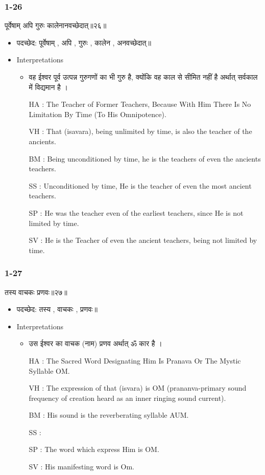 \begin{frame}[fragile]\frametitle{1-26}
\begin{sanskrit}
पूर्वेषाम् अपि गुरुः कालेनानवच्छेदात्॥२६॥
\end{sanskrit}

	\begin{itemize}
	\item पदच्छेद: पूर्वेषाम् , अपि , गुरुः , कालेन , अनवच्छेदात्॥
	\item Interpretations
		\begin{itemize}	
		\item वह ईश्वर पूर्व उत्पन्न गुरुगणों का भी गुरु है, क्योंकि वह काल से सीमित नहीं है अर्थात् सर्वकाल में विद्यमान है ।
		\item [HA]: The Teacher of Former Teachers, Because With Him There Is No Limitation By Time (To His Omnipotence).
		\item [VH]: That (isavara), being unlimited by time, is also the teacher of the ancients.
		\item [BM]: Being unconditioned by time, he is the teachers of even the ancients teachers.
		\item [SS]: Unconditioned by time, He is the teacher of even the most ancient teachers.
		\item [SP]: He was the teacher even of the earliest teachers, since He is not limited by time.
		\item [SV]: He is the Teacher of even the ancient teachers, being not limited by time. 
		\end{itemize}
	\end{itemize}
	
\end{frame}

\begin{frame}[fragile]\frametitle{1-27}
\begin{sanskrit}
तस्य वाचकः प्रणवः॥२७॥
\end{sanskrit}

	\begin{itemize}
	\item पदच्छेद: तस्य , वाचकः , प्रणवः॥
	\item Interpretations
		\begin{itemize}	
		\item उस ईश्वर का वाचक (नाम) प्रणव अर्थात् ॐ कार है ।
		\item [HA]: The Sacred Word Designating Him Is Pranava Or The Mystic Syllable OM.
		\item [VH]: The expression of that (isvara) is OM (prananva-primary sound frequency of creation heard as an inner ringing sound current).
		\item [BM]: His sound is the reverberating syllable AUM.
		\item [SS]:
		\item [SP]: The word which express Him is OM.
		\item [SV]: His manifesting word is Om. 
		\end{itemize}
	\end{itemize}
	
\end{frame}


